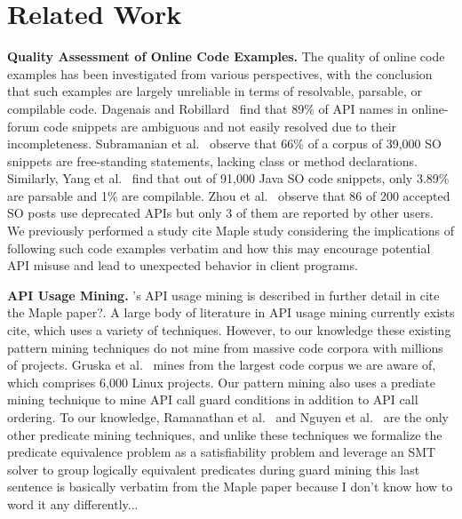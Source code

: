 \section{Related Work} 
{\bf Quality Assessment of Online Code Examples.} The quality of online code examples has been investigated from various perspectives, with the conclusion that such examples are largely unreliable in terms of resolvable, parsable, or compilable code. Dagenais and Robillard~\cite{Dagenais2012} find that 89\% of API names in online-forum code snippets are ambiguous and not easily resolved due to their incompleteness. Subramanian et al.~\cite{subramanian2013making} observe that 66\% of a corpus of 39,000 SO snippets are free-standing statements, lacking class or method declarations. Similarly, Yang et al.~\cite{yang2016query} find that out of 91,000 Java SO code snippets, only 3.89\% are parsable and 1\% are compilable. Zhou et al.~\cite{zhou2016api} observe that 86 of 200 accepted SO posts use deprecated APIs but only 3 of them are reported by other users. We previously performed a study {\todo cite Maple study} considering the implications of following such code examples verbatim and how this may encourage potential API misuse and lead to unexpected behavior in client programs.

{\bf API Usage Mining.} {\soa}'s API usage mining is described in further detail in {\todo cite the Maple paper?}. A large body of literature in API usage mining currently exists {\todo cite}, which uses a variety of techniques. However, to our knowledge these existing pattern mining techniques do not mine from massive code corpora with millions of projects. Gruska et al.~\cite{gruska2010learning} mines from the largest code corpus we are aware of, which comprises 6,000 Linux projects. Our pattern mining also uses a prediate mining technique to mine API call guard conditions in addition to API call ordering. To our knowledge, Ramanathan et al.~\cite{ramanathan2007static} and Nguyen et al.~\cite{nguyen2014mining} are the only other predicate mining techniques, and unlike these techniques we formalize the predicate equivalence problem as a satisfiability problem and leverage an SMT solver to group logically equivalent predicates during guard mining {\todo this last sentence is basically verbatim from the Maple paper because I don't know how to word it any differently...}

